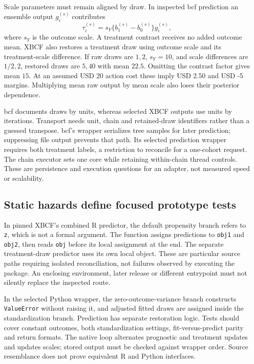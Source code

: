 Scale parameters must remain aligned by draw. In inspected bcf prediction an ensemble output $g_i^{(s)}$ contributes
\begin{equation}
 \tau_i^{(s)}=s_Y\{b_1^{(s)}-b_0^{(s)}\}g_i^{(s)},
 \label{exec21:cxx-restore}
\end{equation}
where $s_Y$ is the outcome scale. A treatment contrast receives no added outcome mean. XBCF also restores a treatment draw using outcome scale and its treatment-scale difference. If raw draws are $1,2$, $s_Y=10$, and scale differences are $1/2,2$, restored draws are $5,40$ with mean $22.5$. Omitting the contrast factor gives mean $15$. At an assumed USD 20 action cost these imply USD 2.50 and USD -5 margins. Multiplying mean raw output by mean scale also loses their posterior dependence.~\citep{exec21_cxx_bcf,exec21_cxx_xbcf,exec21_cxx_reference}

bcf documents draws by units, whereas selected XBCF outputs use units by iterations. Transport needs unit, chain and retained-draw identifiers rather than a guessed transpose. bcf's wrapper serializes tree samples for later prediction; suppressing file output prevents that path. Its selected prediction wrapper requires both treatment labels, a restriction to reconcile for a one-cohort request. The chain executor sets one core while retaining within-chain thread controls. These are persistence and execution questions for an adapter, not measured speed or scalability.~\citep{exec21_cxx_bcf,exec21_cxx_xbcf}

\subsection{Static hazards define focused prototype tests}
\label{exec21:cxx-hazards}
In pinned XBCF's combined R predictor, the default propensity branch refers to \texttt{z}, which is not a formal argument. The function assigns predictions to \texttt{obj1} and \texttt{obj2}, then reads \texttt{obj} before its local assignment at the end. The separate treatment-draw predictor uses its own local object. These are particular source paths requiring isolated reconciliation, not failures observed by executing the package. An enclosing environment, later release or different entrypoint must not silently replace the inspected route.~\citep{exec21_cxx_xbcf}

In the selected Python wrapper, the zero-outcome-variance branch constructs \texttt{ValueError} without raising it, and adjusted fitted draws are assigned inside the standardization branch. Prediction has separate restoration logic. Tests should cover constant outcomes, both standardization settings, fit-versus-predict parity and return formats. The native loop alternates prognostic and treatment updates and updates scales; stored output must be checked against wrapper order. Source resemblance does not prove equivalent R and Python interfaces.~\citep{exec21_cxx_xbcf}

